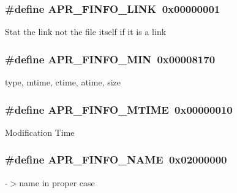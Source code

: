 \subsubsection[{\texorpdfstring{A\+P\+R\+\_\+\+F\+I\+N\+F\+O\+\_\+\+L\+I\+NK}{APR_FINFO_LINK}}]{\setlength{\rightskip}{0pt plus 5cm}\#define A\+P\+R\+\_\+\+F\+I\+N\+F\+O\+\_\+\+L\+I\+NK~0x00000001}\hypertarget{group__apr__file__stat_ga9b0c1d02401b845f928f836fdd3c6712}{}\label{group__apr__file__stat_ga9b0c1d02401b845f928f836fdd3c6712}
Stat the link not the file itself if it is a link 
\subsubsection[{\texorpdfstring{A\+P\+R\+\_\+\+F\+I\+N\+F\+O\+\_\+\+M\+IN}{APR_FINFO_MIN}}]{\setlength{\rightskip}{0pt plus 5cm}\#define A\+P\+R\+\_\+\+F\+I\+N\+F\+O\+\_\+\+M\+IN~0x00008170}\hypertarget{group__apr__file__stat_ga341104571b05550aa923cb14898a82ef}{}\label{group__apr__file__stat_ga341104571b05550aa923cb14898a82ef}
type, mtime, ctime, atime, size 
\subsubsection[{\texorpdfstring{A\+P\+R\+\_\+\+F\+I\+N\+F\+O\+\_\+\+M\+T\+I\+ME}{APR_FINFO_MTIME}}]{\setlength{\rightskip}{0pt plus 5cm}\#define A\+P\+R\+\_\+\+F\+I\+N\+F\+O\+\_\+\+M\+T\+I\+ME~0x00000010}\hypertarget{group__apr__file__stat_ga992ce1f4f75d519fd2a9d241c5a12515}{}\label{group__apr__file__stat_ga992ce1f4f75d519fd2a9d241c5a12515}
Modification Time 
\subsubsection[{\texorpdfstring{A\+P\+R\+\_\+\+F\+I\+N\+F\+O\+\_\+\+N\+A\+ME}{APR_FINFO_NAME}}]{\setlength{\rightskip}{0pt plus 5cm}\#define A\+P\+R\+\_\+\+F\+I\+N\+F\+O\+\_\+\+N\+A\+ME~0x02000000}\hypertarget{group__apr__file__stat_ga7fa4caf84808c11a1ec33c5c8d613e4b}{}\label{group__apr__file__stat_ga7fa4caf84808c11a1ec33c5c8d613e4b}
-\/$>$name in proper case 
